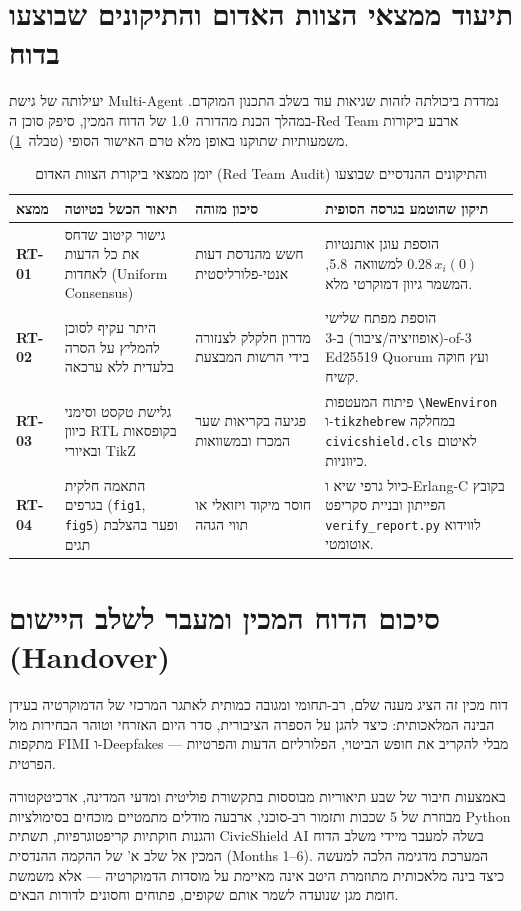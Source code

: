 \section{תיעוד ממצאי הצוות האדום והתיקונים שבוצעו בדוח}
\label{sec:redteam-audit}

יעילותה של גישת Multi-Agent נמדדת ביכולתה לזהות שגיאות עוד בשלב התכנון המוקדם. במהלך הכנת מהדורה~1.0 של הדוח המכין, סיפק סוכן ה-Red Team ארבע ביקורות משמעותיות שתוקנו באופן מלא טרם האישור הסופי (טבלה~\ref{tab:redteam-audit}).

\begin{table}[htbp]
    \centering
    \caption{יומן ממצאי ביקורת הצוות האדום (Red Team Audit) והתיקונים ההנדסיים שבוצעו}
    \label{tab:redteam-audit}
    \begin{tabular}{|p{1.5cm}|p{3.8cm}|p{3.4cm}|p{5.5cm}|}
        \hline
        \textbf{ממצא} & \textbf{תיאור הכשל בטיוטה} & \textbf{סיכון מזוהה} & \textbf{תיקון שהוטמע בגרסה הסופית} \\
        \hline
        \textbf{RT-01} & גישור קיטוב שדחס את כל הדעות לאחדות (Uniform Consensus) & חשש מהנדסת דעות אנטי-פלורליסטית & הוספת עוגן אותנטיות $0.28\,x_i(0)$ למשוואה~5.8, המשמר גיוון דמוקרטי מלא. \\
        \hline
        \textbf{RT-02} & היתר עקיף לסוכן להמליץ על הסרה בלעדית ללא ערכאה & מדרון חלקלק לצנזורה בידי הרשות המבצעת & הוספת מפתח שלישי (אופוזיציה/ציבור) ב-3-of-3 Ed25519 Quorum ועץ חוקה קשיח. \\
        \hline
        \textbf{RT-03} & גלישת טקסט וסימני כיוון RTL בקופסאות ובאיורי TikZ & פגיעה בקריאות שער המכרז ובמשוואות & פיתוח המעטפות \texttt{\textbackslash NewEnviron} ו-\texttt{tikzhebrew} במחלקה \texttt{civicshield.cls} לאיטום כיווניות. \\
        \hline
        \textbf{RT-04} & התאמה חלקית בגרפים (\texttt{fig1}, \texttt{fig5}) ופער בהצלבת תגים & חוסר מיקוד ויזואלי או תווי הגהה & כיול גרפי שיא ו-Erlang-C בקובץ הפייתון ובניית סקריפט \texttt{verify\_report.py} לווידוא אוטומטי. \\
        \hline
    \end{tabular}
\end{table}

\section{סיכום הדוח המכין ומעבר לשלב היישום (Handover)}
\label{sec:handover}

דוח מכין זה הציג מענה שלם, רב-תחומי ומגובה כמותית לאתגר המרכזי של הדמוקרטיה בעידן הבינה המלאכותית: כיצד להגן על הספרה הציבורית, סדר היום האזרחי וטוהר הבחירות מול מתקפות FIMI ו-Deepfakes --- מבלי להקריב את חופש הביטוי, הפלורליזם הדעות והפרטיות הפרטית.

באמצעות חיבור של שבע תיאוריות מבוססות בתקשורת פוליטית ומדעי המדינה, ארכיטקטורה מבוזרת של 5 שכבות ותזמור רב-סוכני, ארבעה מודלים מתמטיים מוכחים בסימולציות Python והגנות חוקתיות קריפטוגרפיות, תשתית CivicShield AI בשלה למעבר מיידי משלב הדוח המכין אל שלב א' של ההקמה ההנדסית (Months 1--6). המערכת מדגימה הלכה למעשה כיצד בינה מלאכותית מתוזמרת היטב אינה מאיימת על מוסדות הדמוקרטיה --- אלא משמשת חומת מגן שנועדה לשמר אותם שקופים, פתוחים וחסונים לדורות הבאים.
